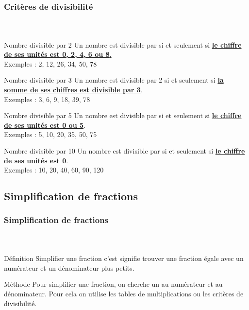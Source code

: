 \documentclass{beamer}
\begin{document}
\begin{frame}[allowframebreaks]
	\frametitle{Critères de divisibilité }  
	\framesubtitle{\ }	
	
	\begin{block}{Nombre divisible par 2}
		Un nombre est divisible par  si et seulement si \underline{\textbf{le chiffre de ses unités est 0, 2, 4, 6 ou 8}.}\\
		Exemples : 2, 12, 26, 34, 50, 78 
	\end{block}
	
	\begin{block}{Nombre divisible par 3}
		Un nombre est divisible par 2 si et seulement si \textbf{\underline{la somme de ses chiffres est divisible par 3}}.\\
		Exemples : 3, 6, 9, 18, 39, 78 
	\end{block}

	\begin{block}{Nombre divisible par 5}
		Un nombre est divisible par  si et seulement si \underline{\textbf{le chiffre de ses unités est 0 ou 5}}.\\
		Exemples : 5, 10, 20, 35, 50, 75 
	\end{block}
	
	\begin{block}{Nombre divisible par 10}
		Un nombre est divisible par  si et seulement si \underline{\textbf{le chiffre de ses unités est 0}}.\\
		Exemples : 10, 20, 40, 60, 90, 120 
	\end{block}		
		
		
\end{frame}

\subsection{Simplification de fractions}

\begin{frame}
	\frametitle{Simplification de fractions}  
	\framesubtitle{\ }	
	
	\begin{block}{Définition}
		Simplifier une fraction c'est signifie trouver une fraction égale avec un numérateur et un dénominateur plus petits.
	\end{block}	
	
	\begin{block}{Méthode}
		Pour simplifier une fraction, on cherche un  au numérateur et au dénominateur. Pour cela on utilise les tables de multiplications ou les critères de divisibilité.
	\end{block}
\end{frame}
\end{document}
